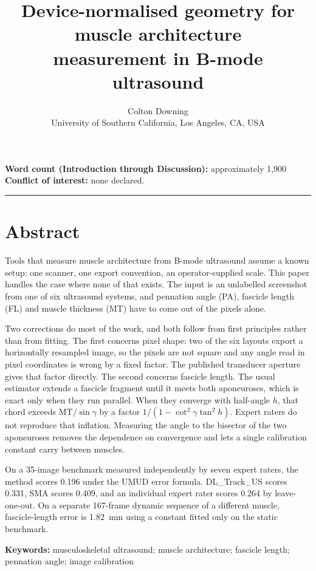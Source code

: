 \documentclass[12pt]{article}
\title{\textbf{Device-normalised geometry for muscle architecture\\
measurement in B-mode ultrasound}}
\author{Colton Downing\\[2pt]
\normalsize University of Southern California, Los Angeles, CA, USA}
\date{}
\begin{document}
\maketitle

\noindent\textbf{Word count (Introduction through Discussion):} approximately 1{,}900\\
\textbf{Conflict of interest:} none declared.

\vspace{1em}
\hrule
\vspace{1em}

\section*{Abstract}

Tools that measure muscle architecture from B-mode ultrasound assume a known
setup: one scanner, one export convention, an operator-supplied scale. This
paper handles the case where none of that exists. The input is an unlabelled
screenshot from one of six ultrasound systems, and pennation angle (PA),
fascicle length (FL) and muscle thickness (MT) have to come out of the pixels
alone.

Two corrections do most of the work, and both follow from first principles
rather than from fitting. The first concerns pixel shape: two of the six
layouts export a horizontally resampled image, so the pixels are not square and
any angle read in pixel coordinates is wrong by a fixed factor. The published
transducer aperture gives that factor directly. The second concerns fascicle
length. The usual estimator extends a fascicle fragment until it meets both
aponeuroses, which is exact only when they run parallel. When they converge with
half-angle $h$, that chord exceeds $\mathrm{MT}/\sin\gamma$ by a factor
$1/(1-\cot^{2}\gamma\tan^{2}h)$. Expert raters do not reproduce that inflation.
Measuring the angle to the bisector of the two aponeuroses removes the
dependence on convergence and lets a single calibration constant carry between
muscles.

On a 35-image benchmark measured independently by seven expert raters, the
method scores 0.196 under the UMUD error formula. DL\_Track\_US scores 0.331,
SMA scores 0.409, and an individual expert rater scores 0.264 by leave-one-out.
On a separate 167-frame dynamic sequence of a different muscle, fascicle-length
error is 1.82~mm using a constant fitted only on the static benchmark.

\vspace{0.5em}
\noindent\textbf{Keywords:} musculoskeletal ultrasound; muscle architecture;
fascicle length; pennation angle; image calibration
\end{document}
